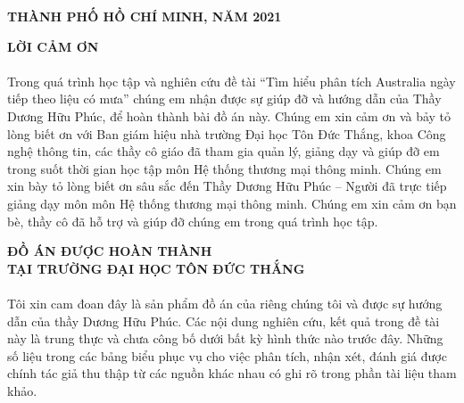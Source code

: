 \documentclass{article}
\begin{document}
\vspace{1cm}
\begin{center}
	\fontsize{14}{20}\selectfont
	\textbf{THÀNH PHỐ HỒ CHÍ MINH, NĂM 2021}
\end{center}
\pagebreak

\pagestyle{fancy}
\fancyhf{}
\chead{\thepage}
\renewcommand{\headrulewidth}{0pt}
\begin{center}
	\setcounter{page}{1}
	\fontsize{16}{20}\selectfont
	\textbf{LỜI CẢM ƠN\\} 
\end{center}
	\fontsize{13}{13}\selectfont
	\paragraph{}
	Trong quá trình học tập và nghiên cứu đề tài “Tìm hiểu phân tích Australia ngày tiếp theo liệu có mưa” chúng em nhận được sự giúp đỡ và hướng dẫn của Thầy Dương Hữu Phúc, để hoàn thành bài đồ án này. Chúng em xin cảm ơn và bảy tỏ lòng biết ơn với Ban giám hiệu nhà trường Đại học Tôn Đức Thắng, khoa Công nghệ thông tin, các thầy cô giáo đã tham gia quản lý, giảng dạy và giúp đỡ em trong suốt thời gian học tập môn Hệ thống thương mại thông minh.
	Chúng em xin bày tỏ lòng biết ơn sâu sắc đến Thầy Dương Hữu Phúc – Người đã trực tiếp giảng dạy môn môn Hệ thống thương mại thông minh. Chúng em xin cảm ơn bạn bè, thầy cô đã hỗ trợ và giúp đỡ chúng em trong quá trình học tập.
 
\pagebreak	%
\begin{center}
	\fontsize{16}{20}\selectfont
	\textbf{ĐỒ ÁN ĐƯỢC HOÀN THÀNH}\\
	\textbf{TẠI TRƯỜNG ĐẠI HỌC TÔN ĐỨC THẮNG\\} 
\end{center}
	\fontsize{13}{13}\selectfont
	\paragraph{}
	Tôi xin cam đoan đây là sản phẩm đồ án của riêng chúng tôi và được sự hướng dẫn của thầy Dương Hữu Phúc. Các nội dung nghiên cứu, kết quả trong đề tài này là trung thực và chưa công bố dưới bất kỳ hình thức nào trước đây. Những số liệu trong các bảng biểu phục vụ cho việc phân tích, nhận xét, đánh giá được chính tác giả thu thập từ các nguồn khác nhau có ghi rõ trong phần tài liệu tham khảo.	
\end{document}
